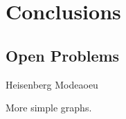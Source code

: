 \documentclass[../thesis-main/thesis-main]{subfiles}
\begin{document}
 
\chapter{Conclusions}

\section{Open Problems}

Heisenberg Modeaoeu

More simple graphs.
\end{document}
